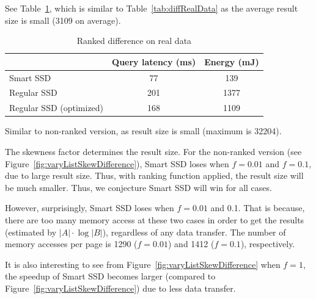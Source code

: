 See Table~\ref{tab:rankDiffRealData}, which is similar to Table~\ref{tab:diffRealData} as the average result size is small (3109 on average).

\begin{table}[tbp]\small
\centering
\begin{tabular}{l|c|c}\hline\hline
& \textbf{Query latency (ms)} & \textbf{Energy (mJ)}\\\hline
Smart SSD & 77  & 139\\\hline
Regular SSD & 201 & 1377\\\hline
Regular SSD (optimized) & 168 & 1109 \\\hline\hline
\end{tabular}
\caption{Ranked difference on real data}\label{tab:rankDiffRealData}
\end{table}

Similar to non-ranked version, as result size is small (maximum is 32204).

The skewness factor determines the result size. For the non-ranked version (see Figure~\ref{fig:varyListSkewDifference}),
Smart SSD loses when $f=0.01$ and $f=0.1$, due to large result size.
Thus, with ranking function applied, the result size will be much smaller. Thus, we conjecture Smart SSD will win for all cases.

However, surprisingly, Smart SSD loses when $f=0.01$ and 0.1. That is because,
there are too many memory access at these two cases in order to get the results (estimated by $|A|\cdot\log |B|$), regardless of any data transfer.
The number of memory accesses per page is 1290 ($f=0.01$) and 1412 ($f=0.1$), respectively.

It is also interesting to see from Figure~\ref{fig:varyListSkewDifference} when $f=1$, the speedup of Smart SSD becomes larger (compared to Figure~\ref{fig:varyListSkewDifference}) due to less data transfer.

